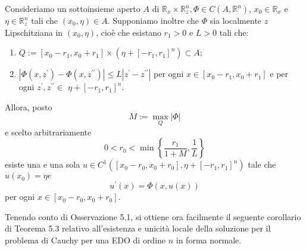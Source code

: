 \begin{shadedTheorem}[$\circ$]
    Consideriamo un sottoinsieme aperto $A$ di $\mathbb{R}_{x} \times \mathbb{R}_{z}^{n}, \Phi \in C\left(A, \mathbb{R}^{n}\right)$, $x_{0} \in \mathbb{R}_{x}$ e $\eta \in \mathbb{R}_{z}^{n}$ tali che $\left(x_{0}, \eta\right) \in A$. Supponiamo inoltre che $\Phi$ sia localmente $z$ Lipschitziana in $\left(x_{0}, \eta\right)$, cioè che esistano $r_{1}>0$ e $L>0$ tali che:
    \begin{enumerate}[i]
        \item $Q:=\left[x_{0}-r_{1}, x_{0}+r_{1}\right] \times\left(\eta+\left[-r_{1}, r_{1}\right]^{n}\right) \subset A$;
        \item $\left|\Phi\left(x, z^{\prime}\right)-\Phi\left(x, z^{\prime \prime}\right)\right| \leq L\left|z^{\prime}-z^{\prime \prime}\right|$ per ogni $x \in\left[x_{0}-r_{1}, x_{0}+r_{1}\right]$ e per ogni $z^{\prime}, z^{\prime \prime} \in$ $\eta+\left[-r_{1}, r_{1}\right]^{n}$.
    \end{enumerate}

    Allora, posto
    \[M:=\max _{Q}|\Phi|\]
    e scelto arbitrariamente
    \[0<r_{0}<\min \left\{\frac{r_{1}}{1+M}, \frac{1}{L}\right\}\]
    esiste una e una sola $u \in C^{1}\left(\left[x_{0}-r_{0}, x_{0}+r_{0}\right], \eta+\left[-r_{1}, r_{1}\right]^{n}\right)$ tale che $u\left(x_{0}\right)=\eta e$
    \[u^{\prime}(x)=\Phi(x, u(x))\]
    per ogni $x \in\left[x_{0}-r_{0}, x_{0}+r_{0}\right]$.
\end{shadedTheorem}
Tenendo conto di Osservazione 5.1, si ottiene ora facilmente il seguente corollario di Teorema 5.3 relativo all'esistenza e unicità locale della soluzione per il problema di Cauchy per una EDO di ordine $n$ in forma normale.
